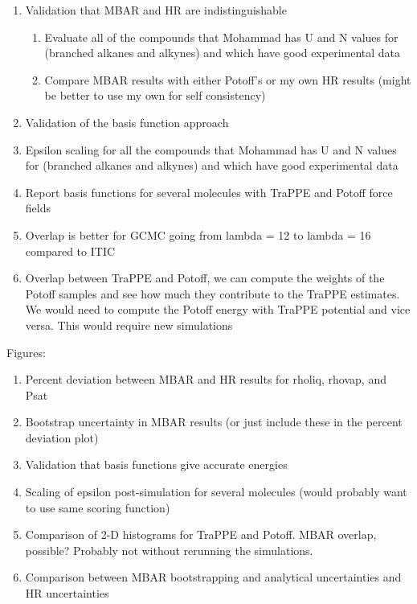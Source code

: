 \documentclass[11pt,a4paper]{article}
\begin{document}
\begin{enumerate}
	\item Validation that MBAR and HR are indistinguishable
	\begin{enumerate}
		\item Evaluate all of the compounds that Mohammad has U and N values for (branched alkanes and alkynes) and which have good experimental data
		\item Compare MBAR results with either Potoff's or my own HR results (might be better to use my own for self consistency)
	\end{enumerate}
    \item Validation of the basis function approach
    \item Epsilon scaling for all the compounds that Mohammad has U and N values for (branched alkanes and alkynes) and which have good experimental data
    \item Report basis functions for several molecules with TraPPE and Potoff force fields
    \item Overlap is better for GCMC going from lambda = 12 to lambda = 16 compared to ITIC
    \item Overlap between TraPPE and Potoff, we can compute the weights of the Potoff samples and see how much they contribute to the TraPPE estimates. We would need to compute the Potoff energy with TraPPE potential and vice versa. This would require new simulations
\end{enumerate}

Figures:

\begin{enumerate}
	\item Percent deviation between MBAR and HR results for rholiq, rhovap, and Psat
	\item Bootstrap uncertainty in MBAR results (or just include these in the percent deviation plot)
	\item Validation that basis functions give accurate energies
	\item Scaling of epsilon post-simulation for several molecules (would probably want to use same scoring function)
	\item Comparison of 2-D histograms for TraPPE and Potoff. MBAR overlap, possible? Probably not without rerunning the simulations.
	\item Comparison between MBAR bootstrapping and analytical uncertainties and HR uncertainties
\end{enumerate}
\end{document}
